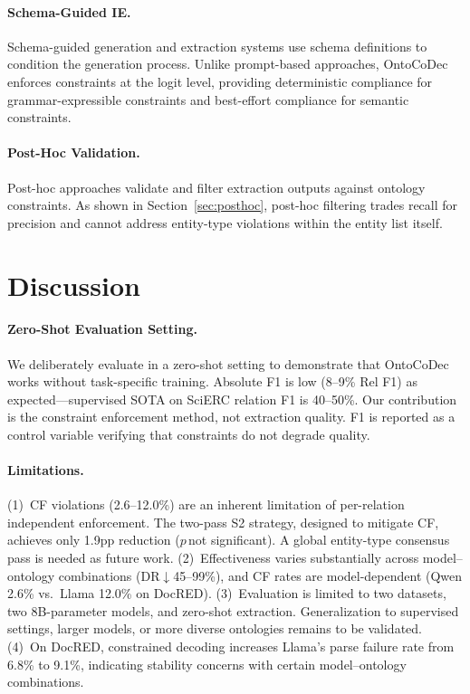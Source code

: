 \documentclass[11pt,a4paper]{article}
\newcommand{\method}{OntoCoDec}
\begin{document}
\paragraph{Schema-Guided IE.}
Schema-guided generation and extraction systems use schema definitions to condition the generation process. Unlike prompt-based approaches, \method{} enforces constraints at the logit level, providing deterministic compliance for grammar-expressible constraints and best-effort compliance for semantic constraints.

\paragraph{Post-Hoc Validation.}
Post-hoc approaches validate and filter extraction outputs against ontology constraints. As shown in Section~\ref{sec:posthoc}, post-hoc filtering trades recall for precision and cannot address entity-type violations within the entity list itself.

\section{Discussion}
\label{sec:discussion}

\paragraph{Zero-Shot Evaluation Setting.}
We deliberately evaluate in a zero-shot setting to demonstrate that \method{} works without task-specific training. Absolute F1 is low (8--9\% Rel F1) as expected---supervised SOTA on SciERC relation F1 is 40--50\%. Our contribution is the constraint enforcement method, not extraction quality. F1 is reported as a control variable verifying that constraints do not degrade quality.

\paragraph{Limitations.}
(1)~CF violations (2.6--12.0\%) are an inherent limitation of per-relation independent enforcement. The two-pass S2 strategy, designed to mitigate CF, achieves only 1.9pp reduction ($p$\,not significant). A global entity-type consensus pass is needed as future work.
(2)~Effectiveness varies substantially across model--ontology combinations (DR$\downarrow$45--99\%), and CF rates are model-dependent (Qwen 2.6\% vs.\ Llama 12.0\% on DocRED).
(3)~Evaluation is limited to two datasets, two 8B-parameter models, and zero-shot extraction. Generalization to supervised settings, larger models, or more diverse ontologies remains to be validated.
(4)~On DocRED, constrained decoding increases Llama's parse failure rate from 6.8\% to 9.1\%, indicating stability concerns with certain model--ontology combinations.
\end{document}
